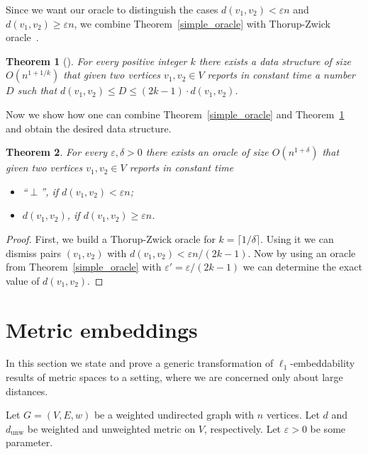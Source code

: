 \documentclass[12pt]{article}
\newcommand{\dunw}{d_{\mathrm{unw}}}
\newcommand{\eps}{\varepsilon}
\newtheorem{theorem}{Theorem}
\begin{document}
    Since we want our oracle to distinguish the cases $d(v_1, v_2) < \eps n$ and $d(v_1, v_2) \geq \eps n$, we combine Theorem~\ref{simple_oracle}
    with Thorup-Zwick oracle~\cite{TZ05}.

    \begin{theorem}[\cite{TZ05}]
        \label{thorup_zwick}
        For every positive integer $k$ there exists a data structure of size $O(n^{1 + 1/k})$ that given two vertices $v_1, v_2 \in V$ reports
        in constant time a number $D$ such that $d(v_1, v_2) \leq D \leq (2k - 1) \cdot d(v_1, v_2)$.
    \end{theorem}

    Now we show how one can combine Theorem~\ref{simple_oracle} and Theorem~\ref{thorup_zwick} and obtain the desired data structure.

    \begin{theorem}
        For every $\eps, \delta > 0$
        there exists an oracle of size $O(n^{1 + \delta})$ that given two vertices $v_1, v_2 \in V$ reports in constant time
        \begin{itemize}
            \item ``$\perp$'', if $d(v_1, v_2) < \eps n$;
            \item $d(v_1, v_2)$, if $d(v_1, v_2) \geq \eps n$.
        \end{itemize}
    \end{theorem}
    \begin{proof}
        First, we build a Thorup-Zwick oracle for $k = \lceil 1 / \delta \rceil$.
        Using it we can dismiss pairs $(v_1, v_2)$ with $d(v_1, v_2) < \eps n / (2k - 1)$.
        Now by using an oracle from Theorem~\ref{simple_oracle} with $\eps' = \eps / (2k - 1)$ we can determine the exact value of $d(v_1, v_2)$.
    \end{proof}

    \section{Metric embeddings}
    \label{metric_embeddings}

    In this section we state and prove a generic transformation of $\ell_1$-embeddability results of metric spaces to a setting, where we are concerned
    only about large distances.

    Let $G = (V, E, w)$ be a weighted undirected graph with $n$ vertices.
    Let $d$ and $\dunw$ be weighted and unweighted metric on $V$, respectively.
    Let $\eps > 0$ be some parameter.
\end{document}
